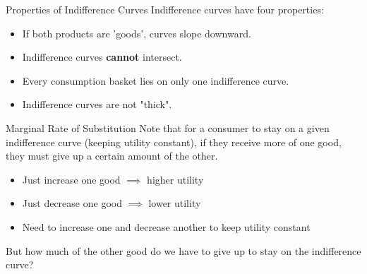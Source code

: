 \documentclass{beamer}
\begin{document}
\begin{frame}{Properties of Indifference Curves}
  Indifference curves have four properties:

  \begin{itemize}
    \item If both products are 'goods', curves slope downward.

    \item Indifference curves \textbf{cannot} intersect.

    \item Every consumption basket lies on only one indifference curve.

    \item Indifference curves are not "thick".
  \end{itemize}

\end{frame}

\begin{frame}{Marginal Rate of Substitution}
  Note that for a consumer to stay on a given indifference curve (keeping utility constant), if they receive more of one good, they must give up a certain amount of the other. 
  
  \bigskip
  \begin{itemize}
    \item Just increase one good $\implies$ higher utility
    \item Just decrease one good $\implies$ lower utility
    \item Need to increase one and decrease another to keep utility constant
  \end{itemize}

  \bigskip
  But how much of the other good do we have to give up to stay on the indifference curve?
\end{frame}
\end{document}
